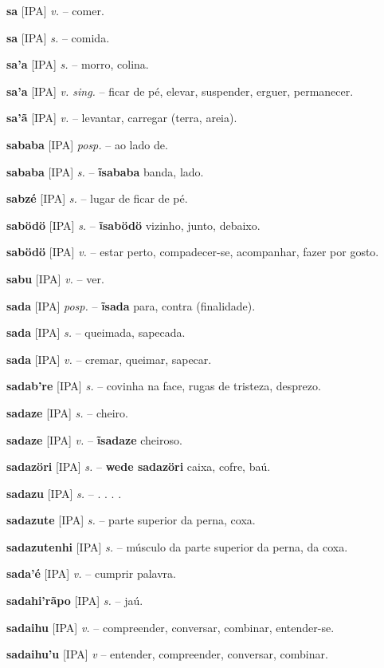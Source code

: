 \textbf{sa} [IPA] \textit{v.} -- comer.

\textbf{sa} [IPA] \textit{s.} -- comida.

\textbf{sa'a} [IPA] \textit{s.} -- morro, colina.

\textbf{sa'a} [IPA] \textit{v. sing.} -- ficar de pé, elevar, suspender, erguer, permanecer.

\textbf{sa'ã} [IPA] \textit{v.} -- levantar, carregar (terra, areia).

\textbf{sababa} [IPA] \textit{posp.} -- ao lado de.

\textbf{sababa} [IPA] \textit{s.} -- \textbf{ĩsababa} banda, lado.

\textbf{sabzé} [IPA] \textit{s.} -- lugar de ficar de pé.

\textbf{sabödö} [IPA] \textit{s.} -- \textbf{ĩsabödö} vizinho, junto, debaixo.

\textbf{sabödö} [IPA] \textit{v.} -- estar perto, compadecer-se, acompanhar, fazer por gosto.

\textbf{sabu} [IPA] \textit{v.} -- ver.

\textbf{sada} [IPA] \textit{posp.} -- \textbf{ĩsada} para, contra (finalidade).

\textbf{sada} [IPA] \textit{s.} -- queimada, sapecada.

\textbf{sada} [IPA] \textit{v.} -- cremar, queimar, sapecar.

\textbf{sadab're} [IPA] \textit{s.} -- covinha na face, rugas de tristeza, desprezo.

\textbf{sadaze} [IPA] \textit{s.} -- cheiro.

\textbf{sadaze} [IPA] \textit{v.} -- \textbf{ĩsadaze} cheiroso.

\textbf{sadazöri} [IPA] \textit{s.} -- \textbf{wede sadazöri} caixa, cofre, baú.

\textbf{sadazu} [IPA] \textit{s.} -- . . . .

\textbf{sadazute} [IPA] \textit{s.} -- parte superior da perna, coxa.

\textbf{sadazutenhi} [IPA] \textit{s.} -- músculo da parte superior da perna, da coxa.

\textbf{sada'é} [IPA] \textit{v.} -- cumprir palavra.

\textbf{sadahi'rãpo} [IPA] \textit{s.} -- jaú.

\textbf{sadaihu} [IPA] \textit{v.} -- compreender, conversar, combinar, entender-se.

\textbf{sadaihu'u} [IPA] \textit{v} -- entender, compreender, conversar, combinar.

